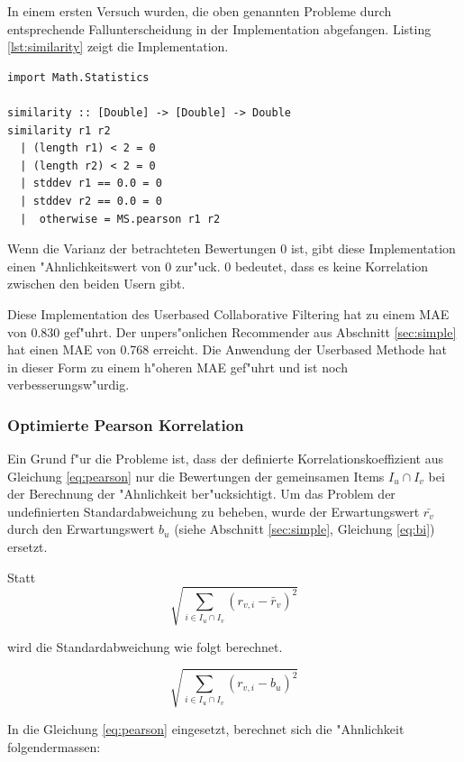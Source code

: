 \documentclass[a4paper, 12pt]{article}
\begin{document}
In einem ersten Versuch wurden, die oben genannten Probleme durch entsprechende Fallunterscheidung in der Implementation abgefangen. Listing \ref{lst:similarity} zeigt die Implementation.

\begin{lstlisting}[caption=Similarity, label=lst:similarity]
import Math.Statistics

similarity :: [Double] -> [Double] -> Double
similarity r1 r2
  | (length r1) < 2 = 0
  | (length r2) < 2 = 0
  | stddev r1 == 0.0 = 0
  | stddev r2 == 0.0 = 0
  |  otherwise = MS.pearson r1 r2

\end{lstlisting}

Wenn die Varianz der betrachteten Bewertungen 0 ist, gibt diese Implementation einen "Ahnlichkeitswert von 0 zur"uck. 0 bedeutet, dass es keine Korrelation zwischen den beiden Usern gibt.

Diese Implementation des Userbased Collaborative Filtering hat zu einem MAE von 0.830 gef"uhrt. Der unpers"onlichen Recommender aus Abschnitt \ref{sec:simple} hat einen MAE von 0.768 erreicht. Die Anwendung der Userbased Methode hat in dieser Form zu einem h"oheren MAE gef"uhrt und ist noch verbesserungsw"urdig. 

\subsubsection{Optimierte Pearson Korrelation}
\label{sec:optpearson}

Ein Grund f"ur die Probleme ist, dass der definierte Korrelationskoeffizient aus Gleichung \ref{eq:pearson} nur die Bewertungen der gemeinsamen Items  $I_u \cap I_v$ bei der Berechnung der "Ahnlichkeit ber"ucksichtigt. Um das Problem der undefinierten Standardabweichung zu beheben, wurde der Erwartungswert $\bar{r_v}$ durch den Erwartungswert $b_u$ (siehe Abschnitt \ref{sec:simple}, Gleichung \ref{eq:bi}) ersetzt.

Statt 
\begin{equation}
  \label{eq:naiv}
  \sqrt{\sum_{i \in I_u \cap I_v}( r_{v,i} - \bar{r}_v)^2}
\end{equation}

wird die Standardabweichung wie folgt berechnet.

\begin{equation}
  \label{eq:naiv}
  \sqrt{\sum_{i \in I_u \cap I_v}( r_{v,i} - b_u)^2}
\end{equation}

In die Gleichung \ref{eq:pearson} eingesetzt, berechnet sich die "Ahnlichkeit folgendermassen:
\end{document}
